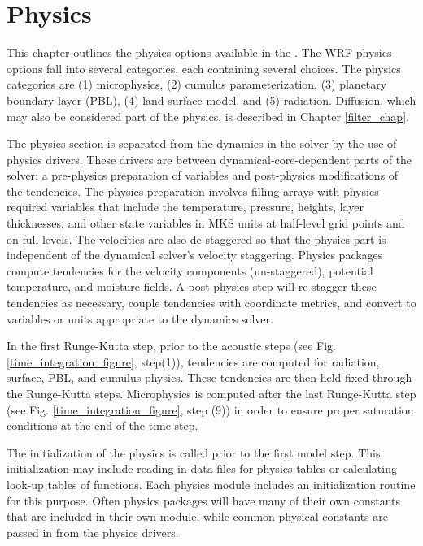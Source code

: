 \chapter{Physics}
\label{physics_chap}

This chapter
outlines the physics options available in the {\wrf}. 
The WRF physics options fall into several categories, each containing
several choices. The physics categories are (1) microphysics, 
(2) cumulus parameterization, (3) planetary boundary layer (PBL), 
(4) land-surface model, and (5) radiation. Diffusion, which
may also be considered part of the physics, 
is described in Chapter \ref{filter_chap}. 

The physics section is separated from the dynamics in the solver by the 
use of physics drivers. These drivers are between dynamical-core-dependent parts
of the solver: a  pre-physics preparation of variables and post-physics 
modifications of the tendencies. The physics preparation involves filling
arrays with physics-required variables that include the temperature,
pressure, heights, layer thicknesses,
and other state variables in MKS units at half-level grid points and on full levels.
The velocities are also de-staggered so that the physics part is independent
of the dynamical solver's velocity staggering. Physics packages 
compute tendencies
for the velocity components (un-staggered), potential temperature, and moisture
fields. A post-physics step will re-stagger these tendencies
as necessary, couple tendencies with coordinate metrics, and convert
to variables or units appropriate to the dynamics solver.

In the first Runge-Kutta step, prior to the acoustic steps (see Fig.
\ref{time_integration_figure}, step(1)), tendencies are computed for
radiation, surface, PBL, and cumulus physics. These tendencies
are then held fixed through the Runge-Kutta steps. Microphysics is
computed after the last Runge-Kutta step 
(see Fig. \ref{time_integration_figure},
step (9)) in order to ensure proper saturation conditions at the end 
of the time-step.

The initialization of the physics is
called prior to the first model step. This initialization may include reading
in data files for physics tables or calculating look-up tables of functions.
Each physics module includes an initialization routine for this purpose.
Often physics packages will have many of their own constants that are
included in their own module, while common physical constants are
passed in from the physics drivers.


